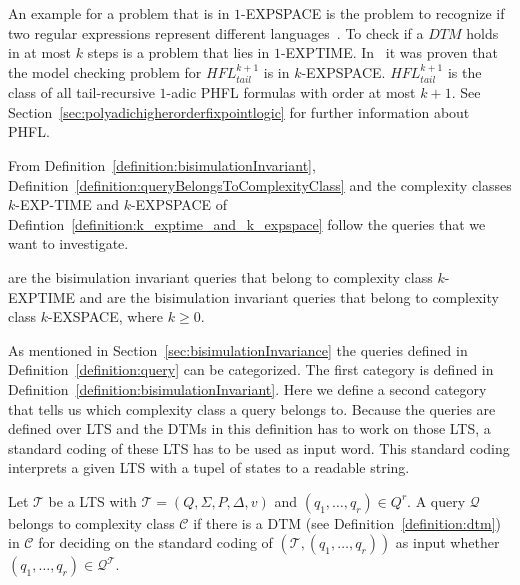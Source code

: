 An example for a problem that is in $1$-EXPSPACE is the problem to recognize
if two regular expressions represent different languages~\cite{meyer1972equivalence}. To check if a $\mathit{DTM}$
holds in at most $k$ steps is a problem that lies in $1$-EXPTIME. In~\cite{bruse2017space} it was proven that the
model checking problem for $\mathit{HFL}^{k + 1}_{tail}$ is in $k$-EXPSPACE. $\mathit{HFL}^{k + 1}_{tail}$ is the
class of all tail-recursive $1$-adic PHFL formulas with order at most $k + 1$. See
Section~\ref{sec:polyadichigherorderfixpointlogic} for further information about PHFL.

From Definition~\ref{definition:bisimulationInvariant}, Definition~\ref{definition:queryBelongsToComplexityClass}
and the complexity classes $k$-EXP-TIME and $k$-EXPSPACE of Defintion~\ref{definition:k_exptime_and_k_expspace} follow
the queries that we want to investigate.

\begin{definition}
    \label{definition:kExptimekExpspace}
     are the bisimulation invariant queries that belong to complexity class $k$-EXPTIME and
     are the bisimulation invariant queries that belong to complexity class $k$-EXSPACE, where $k \geq 0$.
\end{definition}

As mentioned in Section~\ref{sec:bisimulationInvariance} the queries defined in Definition~\ref{definition:query} can be categorized. The first category is defined in Definition~\ref{definition:bisimulationInvariant}. Here we define a second category that tells us which complexity class a query belongs to. Because the queries are defined over LTS and the DTMs in this definition has to work on those LTS, a standard coding of these LTS has to be used as input word. This standard coding interprets a given LTS with a tupel of states to a readable string.

\begin{definition}
    \label{definition:queryBelongsToComplexityClass}
    Let $\mathcal{T}$ be a LTS with $\mathcal{T} = (Q, \Sigma, P, \Delta, v)$ and $(q_1, \dots, q_{r}) \in Q^r$.
    A query $\mathcal{Q}$ belongs to complexity class $\mathcal{C}$ if there is a DTM (see
    Definition~\ref{definition:dtm}) in $\mathcal{C}$ for deciding on the standard coding of $(\mathcal{T}, (q_1, \dots,
    q_{r}))$ as input whether $(q_1, \dots, q_{r}) \in \mathcal{Q}^\mathcal{T}$.
\end{definition}

